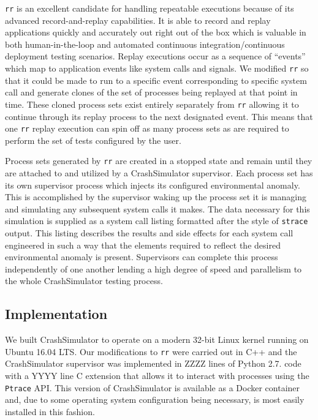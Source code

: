 {\tt rr} is an excellent candidate for handling repeatable executions
because of its advanced record-and-replay capabilities.  It is able to
record and replay applications quickly and accurately out right out of the
box which is valuable in both human-in-the-loop and automated
continuous integration/continuous deployment testing scenarios.  Replay
executions occur as a sequence of ``events'' which map to application
events like system calls and signals.  We modified {\tt rr} so that it
could be made to run to a specific event corresponding to specific system
call and generate clones of the set of processes being replayed at that
point in time.  These cloned process sets exist entirely separately from
{\tt rr} allowing it to continue through its replay process to the next
designated event.  This means that one {\tt rr} replay execution can spin
off as many process sets as are required to perform the set of tests
configured by the user.

Process sets generated by {\tt rr} are created in a stopped state and
remain until they are attached to and utilized by a CrashSimulator
supervisor.  Each process set has its own supervisor process which injects
its configured environmental anomaly.  This is accomplished by the
supervisor waking up the process set it is managing and simulating any
subsequent system calls it makes.  The data necessary for this
simulation is
supplied as a system call listing formatted after the style of {\tt strace}
output. This listing describes the results and side effects for each system
call engineered in such a way that the elements required to reflect the
desired environmental anomaly is present.  Supervisors can complete this
process independently of one another lending a high degree of speed and
parallelism to the whole CrashSimulator testing process.

\subsection{Implementation}

We built CrashSimulator to operate on a modern 32-bit Linux kernel running
on Ubuntu 16.04 LTS.  Our modifications to {\tt rr} were carried out in C++
and the CrashSimulator supervisor was implemented in ZZZZ lines of Python
2.7. code with a YYYY line C extension that allows it to interact with
processes using the {\tt Ptrace} API.  This version of CrashSimulator is
available as a Docker container and, due to some operating system
configuration being necessary, is most easily installed in this fashion.
